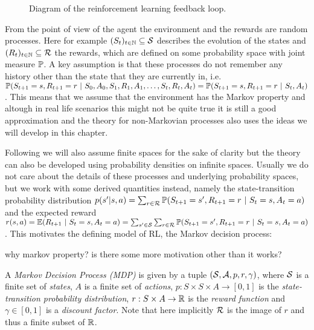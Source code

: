 \usetikzlibrary{graphs, quotes}
\begin{figure}[h]
    \centering
    \caption{Diagram of the reinforcement learning feedback loop.}
    \label{fig:rl_framework}
\end{figure}

From the point of view of the agent the environment and the rewards are random processes. Here for example $(S_t)_{t \in \N} \subseteq \S$ describes the evolution of the states and $(R_t)_{t \in \N} \subseteq \calR$ the rewards, which are defined on some probability space with joint measure $\P$. A key assumption is that these processes do not remember any history other than the state that they are currently in, i.e. $\P(S_{t+1} = s, R_{t+1} = r \ | \ S_0, A_0, S_1, R_1, A_1, \dots, S_t, R_t, A_t) = \P(S_{t+1} = s, R_{t+1} = r \ | \ S_t, A_t)$.
This means that we assume that the environment has the Markov property and altough in real life scenarios this might not be quite true it is still a good approximation and the theory for non-Markovian processes also uses the ideas we will develop in this chapter.

Following \cite{RL2018} we will also assume finite spaces for the sake of clarity but the theory can also be developed using probability densities on infinite spaces. Usually we do not care about the details of these processes and underlying probability spaces, but we work with some derived quantities instead, namely the state-transition probability distribution $p(s' | s, a) = \sum_{r \in \calR} \P(S_{t+1} = s', R_{t+1} = r \ | \ S_t = s, A_t = a)$ and the expected reward $r(s,a) = \E(R_{t+1} \ | \ S_t = s, A_t = a) = \sum_{s' \in \S} \sum_{r \in \calR} \P(S_{t+1} = s', R_{t+1} = r \ | \ S_t = s, A_t = a)$. This motivates the defining model of RL, the Markov decision process:

\begin{notes}
    why markov property? is there some more motivation other than it works?
\end{notes}

\begin{definition}
    \label{def:mdp}
    A \emph{Markov Decision Process (MDP)} is given by a tuple $(\S, \A, p, r, \gamma)$, where $\S$ is a finite set of \emph{states}, $A$ is a finite set of \emph{actions}, $p: S \times S \times A \to [0,1]$ is the \emph{state-transition probability distribution}, $r: S \times A \to \R$ is the \emph{reward function} and $\gamma \in [0,1]$ is a \emph{discount factor}.
    Note that here implicitly $\calR$ is the image of $r$ and thus a finite subset of $\R$.
\end{definition}

